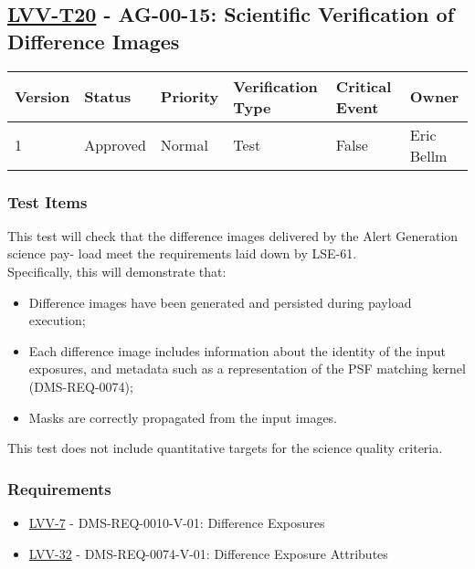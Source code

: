 \hypertarget{lvv-t20---ag-00-15-scientific-verification-of-difference-images}{\subsection{\texorpdfstring{\href{https://jira.lsstcorp.org/secure/Tests.jspa\#/testCase/LVV-T20}{LVV-T20}
- AG-00-15: Scientific Verification of Difference
Images}{LVV-T20 - AG-00-15: Scientific Verification of Difference Images}}\label{lvv-t20---ag-00-15-scientific-verification-of-difference-images}}

\begin{longtable}[]{@{}llllll@{}}
\toprule
Version & Status & Priority & Verification Type & Critical Event &
Owner\tabularnewline
\midrule
\endhead
1 & Approved & Normal & Test & False & Eric Bellm\tabularnewline
\bottomrule
\end{longtable}

\subsubsection{Test Items}\label{test-items-3}

This test will check that the difference images delivered by the Alert
Generation science pay- load meet the requirements laid down by
LSE-61.\\
Specifically, this will demonstrate that:

\begin{itemize}
\tightlist
\item
  Difference images have been generated and persisted during payload
  execution;
\item
  Each difference image includes information about the identity of the
  input exposures, and metadata such as a representation of the PSF
  matching kernel (DMS-REQ-0074);
\item
  Masks are correctly propagated from the input images.
\end{itemize}

This test does not include quantitative targets for the science quality
criteria.

\subsubsection{Requirements}\label{requirements-3}

\begin{itemize}
\tightlist
\item
  \href{https://jira.lsstcorp.org/browse/LVV-7}{LVV-7} -
  DMS-REQ-0010-V-01: Difference Exposures
\item
  \href{https://jira.lsstcorp.org/browse/LVV-32}{LVV-32} -
  DMS-REQ-0074-V-01: Difference Exposure Attributes
\end{itemize}

